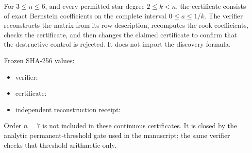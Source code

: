 \documentclass[11pt]{article}
\begin{document}
For $3\le n\le6$, and every permitted star degree $2\le k<n$, the
certificate consists of exact Bernstein coefficients on the complete interval
$0\le a\le1/k$. The verifier reconstructs the matrix from its row
description, recomputes the rook coefficients, checks the certificate, and then
changes the claimed certificate to confirm that the destructive control is
rejected. It does not import the discovery formula.


Frozen SHA-256 values:

\begin{itemize}
\item verifier:
\item certificate:
\item independent reconstruction receipt:
\end{itemize}

Order $n=7$ is not included in these continuous certificates. It is closed
by the analytic permanent-threshold gate used in the manuscript; the same
verifier checks that threshold arithmetic only.
\end{document}
